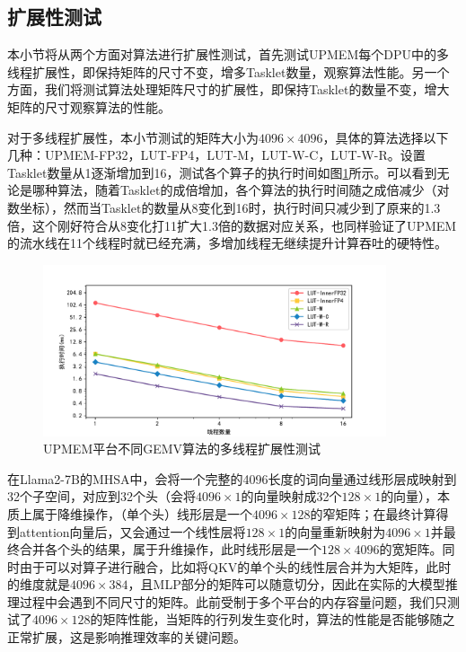 \subsection{扩展性测试}
本小节将从两个方面对算法进行扩展性测试，首先测试UPMEM每个DPU中的多线程扩展性，即保持矩阵的尺寸不变，增多Tasklet数量，观察算法性能。另一个方面，我们将测试算法处理矩阵尺寸的扩展性，即保持Tasklet的数量不变，增大矩阵的尺寸观察算法的性能。

对于多线程扩展性，本小节测试的矩阵大小为$4096\times 4096$，具体的算法选择以下几种：UPMEM-FP32，LUT-FP4，LUT-M，LUT-W-C，LUT-W-R。设置Tasklet数量从1逐渐增加到16，测试各个算子的执行时间如图\ref{EXP3-1}所示。可以看到无论是哪种算法，随着Tasklet的成倍增加，各个算法的执行时间随之成倍减少（对数坐标），然而当Tasklet的数量从8变化到16时，执行时间只减少到了原来的1.3倍，这个刚好符合从8变化打11扩大1.3倍的数据对应关系，也同样验证了UPMEM的流水线在11个线程时就已经充满，多增加线程无继续提升计算吞吐的硬特性。

\begin{figure}[htbp]
    \centering
    \includegraphics[width=0.9\textwidth]{figures/Exp3-1.pdf}
    \caption{UPMEM平台不同GEMV算法的多线程扩展性测试}
	\label{EXP3-1} %
\end{figure}

在Llama2-7B的MHSA中，会将一个完整的4096长度的词向量通过线形层成映射到32个子空间，对应到32个头（会将$4096\times 1$的向量映射成32个$128\times 1$的向量），本质上属于降维操作，（单个头）线形层是一个$4096\times 128$的窄矩阵；在最终计算得到attention向量后，又会通过一个线性层将$128\times 1$的向量重新映射为$4096\times 1$并最终合并各个头的结果，属于升维操作，此时线形层是一个$128\times 4096$的宽矩阵。同时由于可以对算子进行融合，比如将QKV的单个头的线性层合并为大矩阵，此时的维度就是$4096\times 384$，且MLP部分的矩阵可以随意切分，因此在实际的大模型推理过程中会遇到不同尺寸的矩阵。此前受制于多个平台的内存容量问题，我们只测试了$4096\times 128$的矩阵性能，当矩阵的行列发生变化时，算法的性能是否能够随之正常扩展，这是影响推理效率的关键问题。

